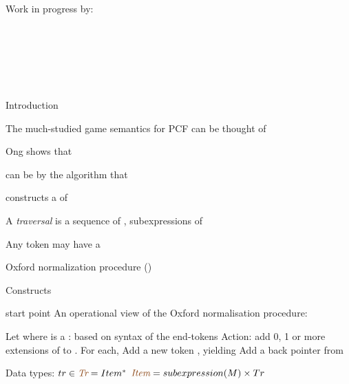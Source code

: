 \documentclass[12pt,fleqn,landscape]{article}
\begin{document}
\begin{center}\LARGE

Work in progress by:
\vair

\bi
\item 
 \\\hair
{}\\
\vair\vair

\item 
 \\\hair
{}\\
\ei
\end{center}


\begin{slide}{Introduction}

The much-studied game semantics for PCF can be thought of


\bc
Ong \cite{ong2015} shows that
\ec

 can be  
  by the algorithm that 

  constructs a  of 
\vair\vair

A \textit{traversal} is a sequence of
\bi
\ii {}, subexpressions of 
  
  \hfill {}
\vair
\ii Any token may have a 
\vair\vair

\ii Oxford normalization procedure ()
\vair\vair

  \bi
  \ii Constructs 
  \ei

\vair\vair
\ei

\end{slide}


\begin{slide}{start point}
\bi
\ii An operational view of the Oxford normalisation procedure: 
\vair

  \bc{}\ec

  \bi
  \ii Let  \hfill where  is a 
  \vair
  \ii {}:
    \bc based on syntax of the end-tokens  \ec
  \vair
  \ii Action: add 0, 1 or more extensions of  to . For each,
  \vair
      \bi
      \ii Add a new token , yielding 
      \ii Add a back pointer from 
      \ei
  \ei
\vair

\ii Data types:
  \bi
  \ii $tr \in \lam{Tr} = Item^{*}$
  \ii $\lam{Item} = subexpression(M) \times Tr$
  \ei
\ei

\end{slide}
\end{document}

